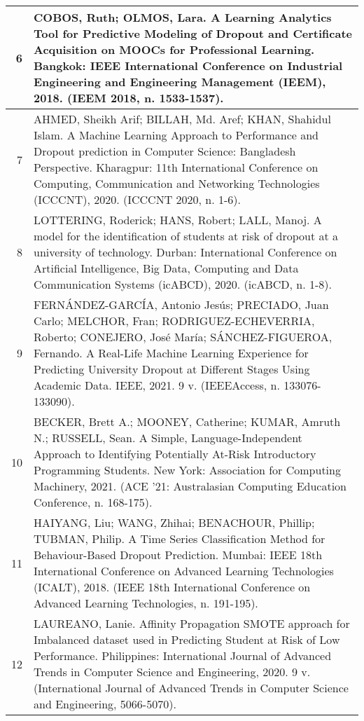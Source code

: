\begin{apendicesenv}
\begin{longtable}[c]{|r|l|}
6 &
  \multicolumn{1}{p{14.5cm}|}{COBOS, Ruth; OLMOS, Lara. A Learning Analytics Tool for Predictive Modeling of Dropout and Certificate Acquisition on MOOCs for Professional Learning. Bangkok: IEEE International Conference on Industrial Engineering and Engineering Management (IEEM), 2018. (IEEM 2018, n. 1533-1537).} \\ \hline
7 &
  \multicolumn{1}{p{14.5cm}|}{AHMED, Sheikh Arif; BILLAH, Md. Aref; KHAN, Shahidul Islam. A Machine Learning Approach to Performance and Dropout prediction in Computer Science: Bangladesh Perspective. Kharagpur: 11th International Conference on Computing, Communication and Networking Technologies (ICCCNT), 2020. (ICCCNT 2020, n. 1-6).} \\ \hline
8 &
  \multicolumn{1}{p{14.5cm}|}{LOTTERING, Roderick; HANS, Robert; LALL, Manoj. A model for the identification of students at risk of dropout at a university of technology. Durban: International Conference on Artificial Intelligence, Big Data, Computing and Data Communication Systems (icABCD), 2020. (icABCD, n. 1-8).} \\ \hline
9 &
  \multicolumn{1}{p{14.5cm}|}{FERNÁNDEZ-GARCÍA, Antonio Jesús; PRECIADO, Juan Carlo; MELCHOR, Fran; RODRIGUEZ-ECHEVERRIA, Roberto; CONEJERO, José María; SÁNCHEZ-FIGUEROA, Fernando. A Real-Life Machine Learning Experience for Predicting University Dropout at Different Stages Using Academic Data. IEEE, 2021. 9 v. (IEEEAccess, n. 133076-133090).} \\ \hline
10 &
  \multicolumn{1}{p{14.5cm}|}{BECKER, Brett A.; MOONEY, Catherine; KUMAR, Amruth N.; RUSSELL, Sean. A Simple, Language-Independent Approach to Identifying Potentially At-Risk Introductory Programming Students. New York: Association for Computing Machinery, 2021. (ACE '21: Australasian Computing Education Conference, n. 168-175).} \\ \hline
11 &
  \multicolumn{1}{p{14.5cm}|}{HAIYANG, Liu; WANG, Zhihai; BENACHOUR, Phillip; TUBMAN, Philip. A Time Series Classification Method for Behaviour-Based Dropout Prediction. Mumbai: IEEE 18th International Conference on Advanced Learning Technologies (ICALT), 2018. (IEEE 18th International Conference on Advanced Learning Technologies, n. 191-195).} \\ \hline
12 &
  \multicolumn{1}{p{14.5cm}|}{LAUREANO, Lanie. Affinity Propagation SMOTE approach for Imbalanced dataset used in Predicting Student at Risk of Low Performance. Philippines: International Journal of Advanced Trends in Computer Science and Engineering, 2020. 9 v. (International Journal of Advanced Trends in Computer Science and Engineering, 5066-5070).} \\ \hline

\end{longtable}
\end{apendicesenv}
